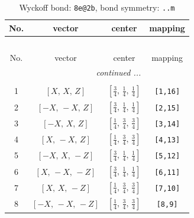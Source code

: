 \documentclass[fleqn,8pt]{jsarticle}
\begin{document}
\begin{longtable}{cccc}
\caption{Wyckoff bond: {\tt 8e@2b}, bond symmetry: {\tt ..m}}
 \\
 \hline \hline
No. & vector & center & mapping \\ \hline \endfirsthead

\multicolumn{3}{l}{\tablename\ \thetable{}} \\
 \hline \hline
No. & vector & center & mapping \\ \hline \endhead

 \hline \hline
\multicolumn{3}{r}{\footnotesize\it continued ...} \\ \endfoot

 \hline \hline
\multicolumn{3}{r}{} \\ \endlastfoot

1 & $\left[ X,\, X,\, Z \right]$ & $\left[ \frac{3}{4},\, \frac{1}{4},\, \frac{1}{4} \right]$ & {\tt [1,16]} \\ \hline
2 & $\left[ - X,\, - X,\, Z \right]$ & $\left[ \frac{3}{4},\, \frac{1}{4},\, \frac{1}{4} \right]$ & {\tt [2,15]} \\ \hline
3 & $\left[ - X,\, X,\, Z \right]$ & $\left[ \frac{1}{4},\, \frac{3}{4},\, \frac{3}{4} \right]$ & {\tt [3,14]} \\ \hline
4 & $\left[ X,\, - X,\, Z \right]$ & $\left[ \frac{1}{4},\, \frac{3}{4},\, \frac{3}{4} \right]$ & {\tt [4,13]} \\ \hline
5 & $\left[ - X,\, X,\, - Z \right]$ & $\left[ \frac{3}{4},\, \frac{1}{4},\, \frac{1}{4} \right]$ & {\tt [5,12]} \\ \hline
6 & $\left[ X,\, - X,\, - Z \right]$ & $\left[ \frac{3}{4},\, \frac{1}{4},\, \frac{1}{4} \right]$ & {\tt [6,11]} \\ \hline
7 & $\left[ X,\, X,\, - Z \right]$ & $\left[ \frac{1}{4},\, \frac{3}{4},\, \frac{3}{4} \right]$ & {\tt [7,10]} \\ \hline
8 & $\left[ - X,\, - X,\, - Z \right]$ & $\left[ \frac{1}{4},\, \frac{3}{4},\, \frac{3}{4} \right]$ & {\tt [8,9]} \\
\end{longtable}
\renewcommand{\arraystretch}{1.2}
\end{document}
